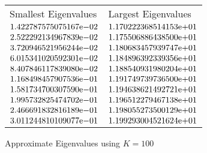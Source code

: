 \begin{enumerate}
\begin{figure} 
 \centering    
\begin{tabular}{ ||p{6cm}||p{6cm}|}
\hline
 Smallest Eigenvalues & Largest Eigenvalues \\ \hhline{|=|=|}   
\hline
${1.422787575075167}\mathrm{e}{-02}$ & ${1.170222368514153}\mathrm{e}{+01}$ \\  
${2.522292134967839}\mathrm{e}{-02}$ & ${1.175506886438500}\mathrm{e}{+01}$ \\  
${3.720946521956244}\mathrm{e}{-02}$ & ${1.180683457939747}\mathrm{e}{+01}$ \\  
${6.015341020592301}\mathrm{e}{-02}$ & ${1.184896392339356}\mathrm{e}{+01}$ \\  
${8.407846117839080}\mathrm{e}{-02}$ & ${1.188540931980204}\mathrm{e}{+01}$ \\  
${1.168498457907536}\mathrm{e}{-01}$ & ${1.191749739736500}\mathrm{e}{+01}$ \\  
${1.581734700307590}\mathrm{e}{-01}$ & ${1.194638621492721}\mathrm{e}{+01}$ \\  
${1.995732825474702}\mathrm{e}{-01}$ & ${1.196512279467138}\mathrm{e}{+01}$ \\  
${2.466691832816189}\mathrm{e}{-01}$ & ${1.198055273500129}\mathrm{e}{+01}$ \\  
${3.011244810109077}\mathrm{e}{-01}$ & ${1.199293004521624}\mathrm{e}{+01}$ \\  
\hline  
\end{tabular} 
\caption{Approximate Eigenvalues using $K = 100$}
   \label{tab:eig100}
\end{figure} 



\end{enumerate}
